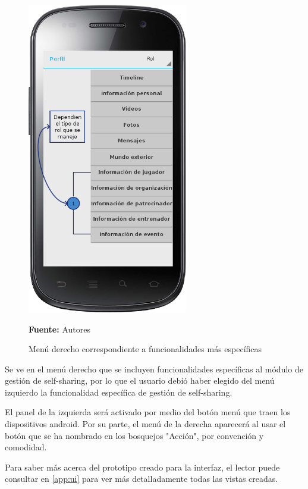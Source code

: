 \begin{figure}[!htb]
  \begin{center}
    \includegraphics[width=7cm]{./imagenes/UI/Self_sharing/self_sharing_2.png}
    \caption{Menú derecho correspondiente a funcionalidades más específicas}
    \label{fig:ui_ejemplo_2}
    \textbf{Fuente:}  Autores
  \end{center}
\end{figure}

Se ve en el menú derecho que se incluyen funcionalidades específicas al módulo de gestión de self-sharing, por lo que el usuario debió haber elegido del menú izquierdo la funcionalidad específica de gestión de self-sharing.

El panel de la izquierda será activado por medio del botón menú que traen los dispositivos android. Por su parte, el menú de la derecha aparecerá al usar el botón que se ha nombrado en los bosquejos "Acción", por convención y comodidad.

Para saber más acerca del prototipo creado para la interfaz, el lector puede consultar en \ref{app:ui} para ver más detalladamente todas las vistas creadas.